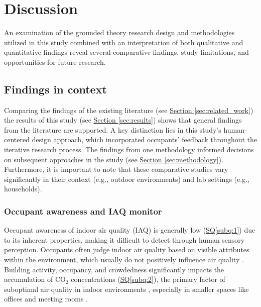 \section{Discussion}
\label{sec:discussion}
An examination of the grounded theory research design and methodologies utilized in this study combined with an interpretation of both qualitative and quantitative findings reveal several comparative findings, study limitations, and opportunities for future research.

\subsection{Findings in context}

Comparing the findings of the existing literature (see \hyperref[sec:related_work]{Section \ref*{sec:related_work}}) the results of this study (see \hyperref[sec:results]{Section \ref*{sec:results}}) shows that general findings from the literature are supported. A key distinction lies in this study's human-centered design approach, which incorporated occupants' feedback throughout the iterative research process. The findings from one methodology informed decisions on subsequent approaches in the study (see \hyperref[sec:methodology]{Section \ref*{sec:methodology}}). Furthermore, it is important to note that these comparative studies vary significantly in their context (e.g., outdoor environments) and lab settings (e.g., households).

\subsubsection{Occupant awareness and IAQ monitor}
Occupant awareness of indoor air quality (IAQ) is generally low (\hyperref[subq:1]{SQ\ref*{subq:1}}) due to its inherent properties, making it difficult to detect through human sensory perception. Occupants often judge indoor air quality based on visible attributes within the environment, which usually do not positively influence air quality \cite{schweizer_indoor_2007} \cite{corlan_importance_2021}. Building activity, occupancy, and crowdedness significantly impacts the accumulation of CO$_{2}$ concentrations (\hyperref[subq:2]{SQ\ref*{subq:2}}), the primary factor of suboptimal air quality in indoor environments \cite{fromme_indoor_2023} \cite{du_indoor_2020}, especially in smaller spaces like offices and meeting rooms \cite{zhong_complexity_2021}.

